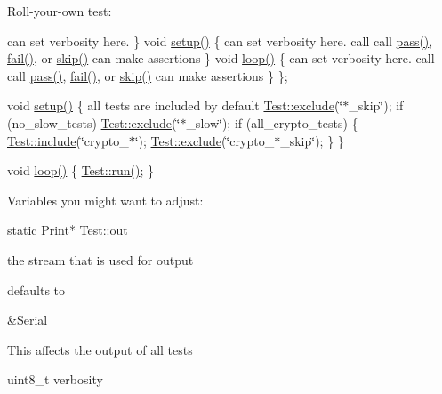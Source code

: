 Roll-\/your-\/own test\-: \begin{DoxyVerb}class MyTest : public Test {
public:
  MyTest(const char *name) : Test(name) {} { 
\end{DoxyVerb}
 can set verbosity here. \} void \hyperlink{class_test_a5eed880dda5138db9b40c6a8c3e6b3c3}{setup()} \{ can set verbosity here. call call \hyperlink{class_test_a34a0e65e4866bfba400f564e9e76a996}{pass()}, \hyperlink{class_test_a5bf0d4600cf540ccd39c12f91e7173de}{fail()}, or \hyperlink{class_test_af2ff3082a0ea33fa0c0ae1aae143d786}{skip()} can make assertions \} void \hyperlink{class_test_a62a1398282c8ef41e33e8f35d165f4b0}{loop()} \{ can set verbosity here. call call \hyperlink{class_test_a34a0e65e4866bfba400f564e9e76a996}{pass()}, \hyperlink{class_test_a5bf0d4600cf540ccd39c12f91e7173de}{fail()}, or \hyperlink{class_test_af2ff3082a0ea33fa0c0ae1aae143d786}{skip()} can make assertions \} \};

void \hyperlink{class_test_a5eed880dda5138db9b40c6a8c3e6b3c3}{setup()} \{ all tests are included by default \hyperlink{class_test_a00269bd7c55b1c93477be06174280b04}{Test\-::exclude}(\char`\"{}$\ast$\-\_\-skip\char`\"{}); if (no\-\_\-slow\-\_\-tests) \hyperlink{class_test_a00269bd7c55b1c93477be06174280b04}{Test\-::exclude}(\char`\"{}$\ast$\-\_\-slow\char`\"{}); if (all\-\_\-crypto\-\_\-tests) \{ \hyperlink{class_test_acfe763aab53dbecab02f473b93536347}{Test\-::include}(\char`\"{}crypto\-\_\-$\ast$\char`\"{}); \hyperlink{class_test_a00269bd7c55b1c93477be06174280b04}{Test\-::exclude}(\char`\"{}crypto\-\_\-$\ast$\-\_\-skip\char`\"{}); \} \}

void \hyperlink{class_test_a62a1398282c8ef41e33e8f35d165f4b0}{loop()} \{ \hyperlink{class_test_abb64a8b970de8b2422b9f56cd8719ca4}{Test\-::run()}; \}

Variables you might want to adjust\-: \begin{DoxyVerb}static Print* Test::out
\end{DoxyVerb}



\begin{DoxyItemize}
\item the stream that is used for output
\item defaults to \begin{DoxyVerb}&Serial
\end{DoxyVerb}

\end{DoxyItemize}


\begin{DoxyItemize}
\item This affects the output of all tests

uint8\-\_\-t verbosity
\end{DoxyItemize}



